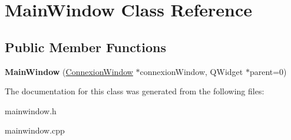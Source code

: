 \hypertarget{class_main_window}{\section{Main\-Window Class Reference}
\label{class_main_window}
}
\subsection*{Public Member Functions}
\begin{DoxyCompactItemize}
\item 
\hypertarget{class_main_window_a4de8eb68b4ace1b1659ae4a6ed7a4c79}{{\bfseries Main\-Window} (\hyperlink{class_connexion_window}{Connexion\-Window} $\ast$connexion\-Window, Q\-Widget $\ast$parent=0)}\label{class_main_window_a4de8eb68b4ace1b1659ae4a6ed7a4c79}

\end{DoxyCompactItemize}


The documentation for this class was generated from the following files\-:\begin{DoxyCompactItemize}
\item 
mainwindow.\-h\item 
mainwindow.\-cpp\end{DoxyCompactItemize}
